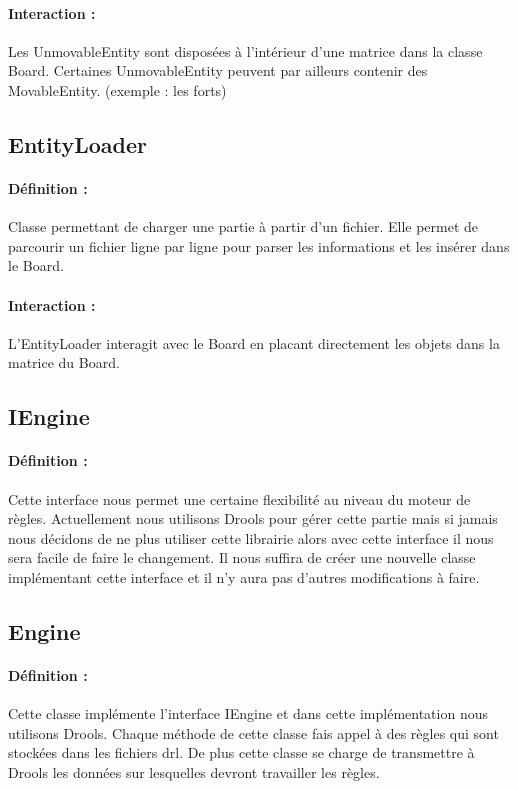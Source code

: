 			\paragraph{Interaction :}
			Les UnmovableEntity sont disposées à l'intérieur d'une matrice dans la classe Board. 
			Certaines UnmovableEntity peuvent par ailleurs contenir des MovableEntity. (exemple : les forts)

		\subsection*{EntityLoader}

			\paragraph{Définition :}
			Classe permettant de charger une partie à partir d'un fichier.
			Elle permet de parcourir un fichier ligne par ligne pour parser les informations et les insérer dans le Board.
			\paragraph{Interaction :}
			L'EntityLoader interagit avec le Board en placant directement les objets dans la matrice du Board.
			
		\subsection*{IEngine}

			\paragraph{Définition :}
			Cette interface nous permet une certaine flexibilité au niveau du moteur de règles. Actuellement nous utilisons Drools pour gérer cette partie mais si jamais nous décidons de ne plus utiliser cette librairie alors avec cette interface il nous sera facile de faire le changement.
			Il nous suffira de créer une nouvelle classe implémentant cette interface et il n'y aura pas d'autres modifications à faire.

		\subsection*{Engine}

			\paragraph{Définition :}
			Cette classe implémente l'interface IEngine et dans cette implémentation nous utilisons Drools. Chaque méthode de cette classe fais appel à des règles qui sont stockées dans les fichiers drl. 
			De plus cette classe se charge de transmettre à Drools les données sur lesquelles devront travailler les règles.

